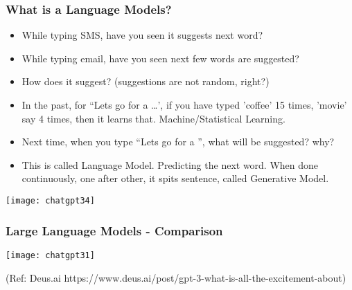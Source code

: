 

\begin{frame}[fragile]\frametitle{What is a Language Models?}

\begin{itemize}
\item While typing SMS, have you seen it suggests next word?
\item While typing email, have you seen next few words are suggested?
\item How does it suggest? (suggestions are not random, right?)
\item In the past, for ``Lets go for a \ldots', if you have typed 'coffee' 15 times, 'movie' say 4 times, then it learns that. Machine/Statistical Learning.
\item Next time, when you type ``Lets go for a '', what will be suggested? why?
\item This is called Language Model. Predicting the next word. When done continuously, one after other, it spits sentence, called Generative Model.
\end{itemize}	

\begin{center}
\texttt{[image: chatgpt34]}
\end{center}		

\end{frame}





\begin{frame}[fragile]\frametitle{Large Language Models - Comparison}

\begin{center}
\texttt{[image: chatgpt31]}
\end{center}				
{\tiny (Ref: Deus.ai https://www.deus.ai/post/gpt-3-what-is-all-the-excitement-about)}

\end{frame}



